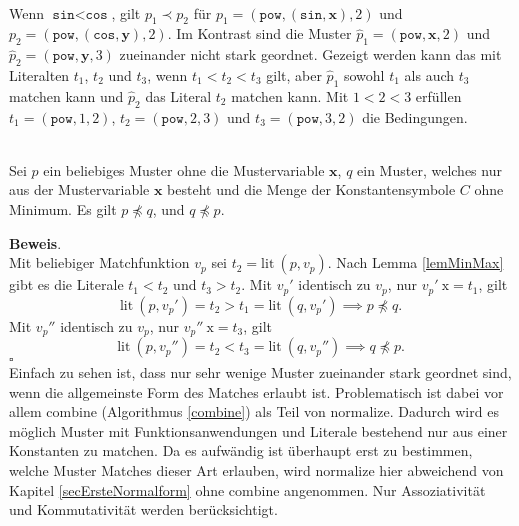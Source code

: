 \begin{beispiel}~\\
Wenn $\texttt{sin} < \texttt{cos}$, gilt $p_1 \prec p_2$ für $p_1 = (\texttt{pow}, (\texttt{sin}, \mathbf x), 2)$ und $p_2 = (\texttt{pow}, (\texttt{cos}, \mathbf y), 2)$. Im Kontrast sind die Muster $\hat p_1 = (\texttt{pow}, \mathbf x, 2)$ und $\hat p_2 = (\texttt{pow}, \mathbf y, 3)$ zueinander nicht stark geordnet. Gezeigt werden kann das mit Literalten $t_1$, $t_2$ und $t_3$, wenn ${t_1 < t_2 < t_3}$ gilt, aber $\hat p_1$ sowohl $t_1$ als auch $t_3$ matchen kann und $\hat p_2$ das Literal $t_2$ matchen kann. Mit $1 < 2 < 3$ erfüllen $t_1 = (\texttt{pow}, 1, 2)$, $t_2 = (\texttt{pow}, 2, 3)$ und $t_3 = (\texttt{pow}, 3, 2)$ die Bedingungen.
\end{beispiel}

\begin{lemma}~\\
Sei $p$ ein beliebiges Muster ohne die Mustervariable $\mathbf x$, $q$ ein Muster, welches nur aus der Mustervariable $\mathbf x$ besteht und die Menge der Konstantensymbole $C$ ohne Minimum.
Es gilt $p \not\preceq q$, und $q \not\preceq p$.
\end{lemma}

\textbf{Beweis}.\\
Mit beliebiger Matchfunktion $v_p$ sei $t_2 = \mathrm{lit}~(p, v_p)$. Nach Lemma \ref{lemMinMax} gibt es die Literale $t_1 < t_2$ und $t_3 > t_2$. 
Mit $v_p'$ identisch zu $v_p$, nur $v_p'~\mathrm x = t_1$, gilt 
$$\mathrm{lit}~(p, v_p') = t_2 > t_1 = \mathrm{lit}~(q, v_p') \implies p \not\preceq q.$$
Mit $v_p''$ identisch zu $v_p$, nur $v_p''~\mathrm x = t_3$, gilt 
$$\mathrm{lit}~(p, v_p'') = t_2 < t_3 = \mathrm{lit}~(q, v_p'') \implies q \not\preceq p.$$
\hfill $\square$\\


Einfach zu sehen ist, dass nur sehr wenige Muster zueinander stark geordnet sind, wenn die allgemeinste Form des Matches erlaubt ist. Problematisch ist dabei vor allem $\mathrm{combine}$ (Algorithmus \ref{combine}) als Teil von $\mathrm{normalize}$. Dadurch wird es möglich Muster mit Funktionsanwendungen und Literale bestehend nur aus einer Konstanten zu matchen. Da es aufwändig ist überhaupt erst zu bestimmen, welche Muster Matches dieser Art erlauben, wird $\mathrm{normalize}$ hier abweichend von Kapitel \ref{secErsteNormalform} ohne $\mathrm{combine}$ angenommen. Nur Assoziativität und Kommutativität werden berücksichtigt.

